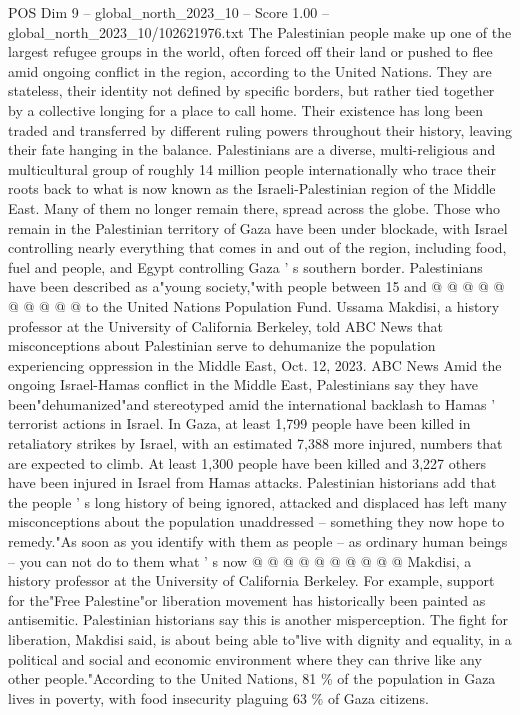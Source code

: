 \begin{textsample}{POS Dim 9 – global\_north\_2023\_10 – Score 1.00 – global\_north\_2023\_10/102621976.txt}  \label{ex:f9_pos_302}
The Palestinian people make up one of the largest refugee groups in the world, often forced off their land or pushed to flee amid ongoing conflict in the region, according to the United Nations.
They are stateless, their identity not defined by specific borders, but rather tied together by a collective longing for a place to call home.
Their existence has long been traded and transferred by different ruling powers throughout their history, leaving their fate hanging in the balance.
Palestinians are a diverse, multi-religious and multicultural group of roughly 14 million people internationally who trace their roots back to what is now known as the Israeli-Palestinian region of the Middle East.
Many of them no longer remain there, spread across the globe.
Those who remain in the Palestinian territory of Gaza have been under blockade, with Israel controlling nearly everything that comes in and out of the region, including food, fuel and people, and Egypt controlling Gaza ' s southern border.
Palestinians have been described as a"young society,"with people between 15 and @ @ @ @ @ @ @ @ @ @ to the United Nations Population Fund.
Ussama Makdisi, a history professor at the University of California Berkeley, told ABC News that misconceptions about Palestinian serve to dehumanize the population experiencing oppression in the Middle East, Oct. 12, 2023.
ABC News Amid the ongoing Israel-Hamas conflict in the Middle East, Palestinians say they have been"dehumanized"and stereotyped amid the international backlash to Hamas ' terrorist actions in Israel.
In Gaza, at least 1,799 people have been killed in retaliatory strikes by Israel, with an estimated 7,388 more injured, numbers that are expected to climb.
At least 1,300 people have been killed and 3,227 others have been injured in Israel from Hamas attacks.
Palestinian historians add that the people ' s long history of being ignored, attacked and displaced has left many misconceptions about the population unaddressed -- something they now hope to remedy."As soon as you identify with them as people -- as ordinary human beings -- you can not do to them what ' s now @ @ @ @ @ @ @ @ @ @ Makdisi, a history professor at the University of California Berkeley.
For example, support for the"Free Palestine"or liberation movement has historically been painted as antisemitic.
Palestinian historians say this is another misperception.
The fight for liberation, Makdisi said, is about being able to"live with dignity and equality, in a political and social and economic environment where they can thrive like any other people."According to the United Nations, 81 \% of the population in Gaza lives in poverty, with food insecurity plaguing 63 \% of Gaza citizens.

\end{textsample}
